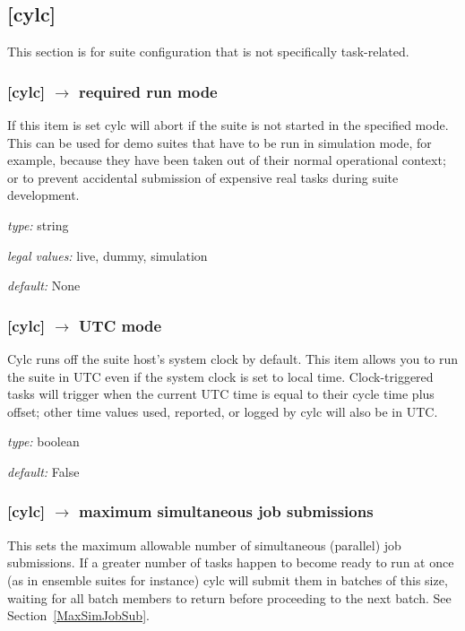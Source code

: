 \subsection{[cylc]}

This section is for suite configuration that is not specifically
task-related.

\subsubsection[required run mode]{ [cylc] $\rightarrow$ required run mode}

If this item is set cylc will abort if the suite is not started in the
specified mode. This can be used for demo suites that have to be
run in simulation mode, for example, because they have been taken out of
their normal operational context; or to prevent accidental submission of
expensive real tasks during suite development. 
\begin{myitemize}
    \item {\em type:} string
    \item {\em legal values:} live, dummy, simulation 
    \item {\em default:} None 
\end{myitemize}

\subsubsection[UTC mode]{ [cylc] $\rightarrow$ UTC mode}

Cylc runs off the suite host's system clock by default. This item allows
you to run the suite in UTC even if the system clock is set to local time.
Clock-triggered tasks will trigger when the current UTC time is equal to
their cycle time plus offset; other time values used, reported, or
logged by cylc will also be in UTC. 

\begin{myitemize}
    \item {\em type:} boolean
    \item {\em default:} False 
\end{myitemize}

\subsubsection[maximum simultaneous job submissions]{[cylc] $\rightarrow$ maximum simultaneous job submissions}

This sets the maximum allowable number of simultaneous (parallel) job
submissions. If a greater number of tasks happen to become ready to run
at once (as in ensemble suites for instance) cylc will submit them in
batches of this size, waiting for all batch members to return before
proceeding to the next batch. See Section~\ref{MaxSimJobSub}.

